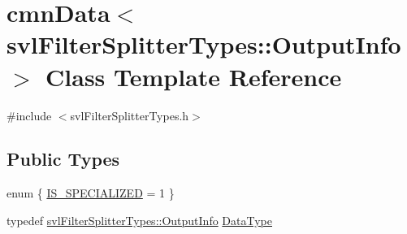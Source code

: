 \hypertarget{classcmn_data_3_01svl_filter_splitter_types_1_1_output_info_01_4}{}\section{cmn\+Data$<$ svl\+Filter\+Splitter\+Types\+:\+:Output\+Info $>$ Class Template Reference}
\label{classcmn_data_3_01svl_filter_splitter_types_1_1_output_info_01_4}


{\ttfamily \#include $<$svl\+Filter\+Splitter\+Types.\+h$>$}

\subsection*{Public Types}
\begin{DoxyCompactItemize}
\item 
enum \{ \hyperlink{classcmn_data_3_01svl_filter_splitter_types_1_1_output_info_01_4_a01a30c1bb35f2a9890fbf9e2904e18e7a16a1a784e3773c10c5583a1bd935d699}{I\+S\+\_\+\+S\+P\+E\+C\+I\+A\+L\+I\+Z\+E\+D} = 1
 \}
\item 
typedef \hyperlink{classsvl_filter_splitter_types_1_1_output_info}{svl\+Filter\+Splitter\+Types\+::\+Output\+Info} \hyperlink{classcmn_data_3_01svl_filter_splitter_types_1_1_output_info_01_4_ad3099e3eeadaec326e214501ba10a222}{Data\+Type}
\end{DoxyCompactItemize}
